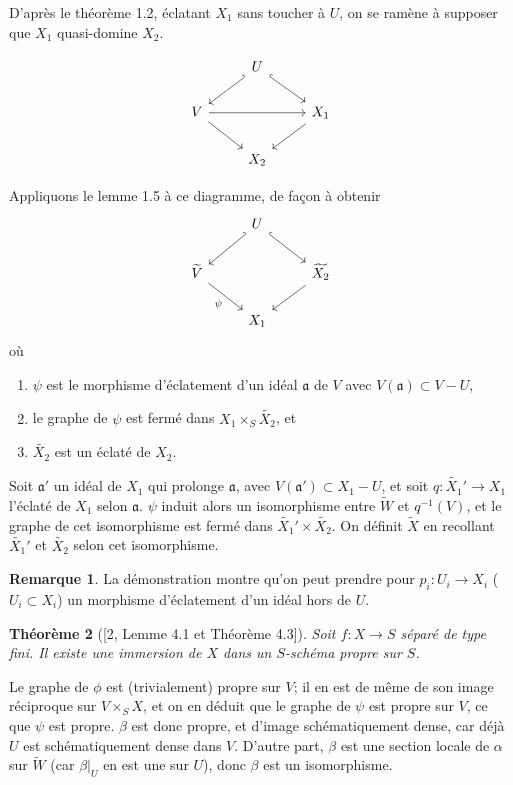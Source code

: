 \documentclass[11pt,a4paper]{article}
\theoremstyle{plain}
\newtheorem{theorem}{Th\'eor\`eme}
\theoremstyle{definition}
\newtheorem{remark}[theorem]{Remarque}
\begin{document}
D'apr\`es le th\'eor\`eme 1.2, \'eclatant $X_1$ sans toucher \`a $U$, on se ram\`ene \`a supposer que $X_1$ quasi-domine $X_2$.

\[
\begin{tikzcd}
& U \arrow[dl, hook'] \arrow[dr, hook] \\
V \arrow[dr] \arrow[rr] & & X_1 \arrow[dl] \\
& X_2
\end{tikzcd}
\]

Appliquons le lemme 1.5 \`a ce diagramme, de fa\c{c}on \`a obtenir
\[
\begin{tikzcd}
& U \arrow[dl, hook'] \arrow[dr, hook] \\
\widetilde{V} \arrow[dr, "\psi"'] & & \widetilde{X_2} \arrow[dl] \\
& X_1
\end{tikzcd}
\]
o\`u
\begin{enumerate}[label=(\alph*)]
\item $\psi$ est le morphisme d'\'eclatement d'un id\'eal $\mathfrak{a}$ de $V$ avec $V(\mathfrak{a}) \subset V - U$,
\item le graphe de $\psi$ est ferm\'e dans $X_1 \times_S \widetilde{X_2}$, et
\item $\widetilde{X_2}$ est un \'eclat\'e de $X_2$.
\end{enumerate}

Soit $\mathfrak{a}'$ un id\'eal de $X_1$ qui prolonge $\mathfrak{a}$, avec $V(\mathfrak{a}') \subset X_1 - U$, et soit $q: \widetilde{X_1}' \to X_1$ l'\'eclat\'e de $X_1$ selon $\mathfrak{a}$. $\psi$ induit alors un isomorphisme entre $\widetilde{W}$ et $q^{-1}(V)$, et le graphe de cet isomorphisme est ferm\'e dans $\widetilde{X_1}' \times \widetilde{X_2}$. On d\'efinit $\widetilde{X}$ en recollant $\widetilde{X_1}'$ et $\widetilde{X_2}$ selon cet isomorphisme.

\begin{remark}
La d\'emonstration montre qu'on peut prendre pour $p_i: U_i \to X_i$ ($U_i \subset X_i$) un morphisme d'\'eclatement d'un id\'eal hors de $U$.
\end{remark}

\begin{theorem}[{[2, Lemme 4.1 et Th\'eor\`eme 4.3]}]
Soit $f: X \to S$ s\'epar\'e de type fini. Il existe une immersion de $X$ dans un $S$-sch\'ema propre sur $S$.
\end{theorem}

Le graphe de $\phi$ est (trivialement) propre sur $V$; il en est de m\^eme de son image r\'eciproque sur $V \times_S X$, et on en d\'eduit que le graphe de $\psi$ est propre sur $V$, ce que $\psi$ est propre. $\beta$ est donc propre, et d'image sch\'ematiquement dense, car d\'ej\`a $U$ est sch\'ematiquement dense dans $V$. D'autre part, $\beta$ est une section locale de $\alpha$ sur $\widetilde{W}$ (car $\beta|_U$ en est une sur $U$), donc $\beta$ est un isomorphisme.
\end{document}
